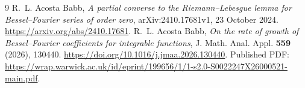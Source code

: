 \documentclass[11pt]{article}
\begin{document}
\begin{thebibliography}{9}
R.~L. Acosta Babb,
\emph{A partial converse to the Riemann--Lebesgue lemma for
Bessel--Fourier series of order zero},
arXiv:2410.17681v1, 23 October 2024.
\url{https://arxiv.org/abs/2410.17681}.
R.~L. Acosta Babb,
\emph{On the rate of growth of Bessel--Fourier coefficients for
integrable functions},
J. Math. Anal. Appl. \textbf{559} (2026), 130440.
\url{https://doi.org/10.1016/j.jmaa.2026.130440}.
Published PDF:
\url{https://wrap.warwick.ac.uk/id/eprint/199656/1/1-s2.0-S0022247X26000521-main.pdf}.
\end{thebibliography}
\end{document}
